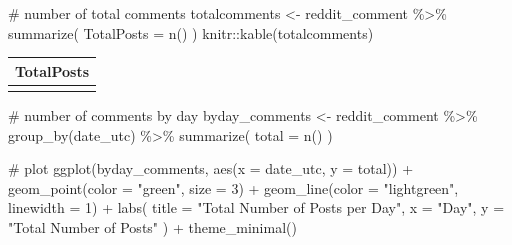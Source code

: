 \documentclass[
  letterpaper,
  DIV=11,
  numbers=noendperiod]{scrartcl}
\newenvironment{Shaded}{\begin{snugshade}}{\end{snugshade}}
\newcommand{\AttributeTok}[1]{\textcolor[rgb]{0.40,0.45,0.13}{#1}}
\newcommand{\CommentTok}[1]{\textcolor[rgb]{0.37,0.37,0.37}{#1}}
\newcommand{\DecValTok}[1]{\textcolor[rgb]{0.68,0.00,0.00}{#1}}
\newcommand{\FunctionTok}[1]{\textcolor[rgb]{0.28,0.35,0.67}{#1}}
\newcommand{\NormalTok}[1]{\textcolor[rgb]{0.00,0.23,0.31}{#1}}
\newcommand{\OtherTok}[1]{\textcolor[rgb]{0.00,0.23,0.31}{#1}}
\newcommand{\SpecialCharTok}[1]{\textcolor[rgb]{0.37,0.37,0.37}{#1}}
\newcommand{\StringTok}[1]{\textcolor[rgb]{0.13,0.47,0.30}{#1}}
\begin{document}
\begin{Shaded}
\begin{Highlighting}[]
\CommentTok{\# number of total comments}
\NormalTok{totalcomments }\OtherTok{\textless{}{-}}\NormalTok{ reddit\_comment }\SpecialCharTok{\%\textgreater{}\%}
  \FunctionTok{summarize}\NormalTok{(}
    \AttributeTok{TotalPosts =} \FunctionTok{n}\NormalTok{()}
\NormalTok{  )}
\NormalTok{knitr}\SpecialCharTok{::}\FunctionTok{kable}\NormalTok{(totalcomments)}
\end{Highlighting}
\end{Shaded}

\begin{longtable}[]{@{}r@{}}
\toprule\noalign{}
TotalPosts \\
\midrule\noalign{}
\endhead
\bottomrule\noalign{}
\endlastfoot
12492 \\
\end{longtable}

\begin{Shaded}
\begin{Highlighting}[]
\CommentTok{\# number of comments by day}
\NormalTok{byday\_comments }\OtherTok{\textless{}{-}}\NormalTok{ reddit\_comment }\SpecialCharTok{\%\textgreater{}\%}
  \FunctionTok{group\_by}\NormalTok{(date\_utc) }\SpecialCharTok{\%\textgreater{}\%}
  \FunctionTok{summarize}\NormalTok{(}
    \AttributeTok{total =} \FunctionTok{n}\NormalTok{()}
\NormalTok{  )}

\CommentTok{\# plot}
\FunctionTok{ggplot}\NormalTok{(byday\_comments, }\FunctionTok{aes}\NormalTok{(}\AttributeTok{x =}\NormalTok{ date\_utc, }\AttributeTok{y =}\NormalTok{ total)) }\SpecialCharTok{+} 
  \FunctionTok{geom\_point}\NormalTok{(}\AttributeTok{color =} \StringTok{"green"}\NormalTok{, }\AttributeTok{size =} \DecValTok{3}\NormalTok{) }\SpecialCharTok{+}  
  \FunctionTok{geom\_line}\NormalTok{(}\AttributeTok{color =} \StringTok{"lightgreen"}\NormalTok{, }\AttributeTok{linewidth =} \DecValTok{1}\NormalTok{) }\SpecialCharTok{+}
  \FunctionTok{labs}\NormalTok{(}
    \AttributeTok{title =} \StringTok{"Total Number of Posts per Day"}\NormalTok{,}
    \AttributeTok{x =} \StringTok{"Day"}\NormalTok{,}
    \AttributeTok{y =} \StringTok{"Total Number of Posts"}
\NormalTok{  ) }\SpecialCharTok{+}
  \FunctionTok{theme\_minimal}\NormalTok{()}
\end{Highlighting}
\end{Shaded}
\end{document}
